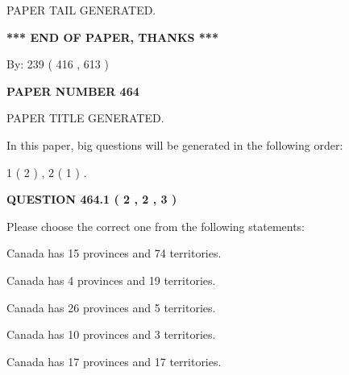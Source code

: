 \documentclass[12pt]{article}
\begin{document}
   
   
\vspace{2.0in} PAPER TAIL GENERATED.
   
   
   
   
\vspace{1.0in} 
{\textbf{\large{ *** END OF PAPER, THANKS *** }}} 
   
   
\hspace{1.0in} By: 
 239 ( 416 ,  613 )
   
   
   
   
\newpage 
\setcounter{page}{ 
   464001 } 
   
   
   
   
 {\textbf{ \Large{ PAPER NUMBER  464  }}}
   
   
\vspace{0.2in}
   
   
   
   
   
   
   
   
 \vspace{0.2in}
 
 
 
 
   
   
 PAPER TITLE GENERATED.
   
   
   
\vspace{0.2in}
   
In this paper, big questions will be generated in the following order: 
   
   
   1 ( 2 )
 ,
   2 ( 1 )
 .
  
\vspace{0.2in}
  
{\textbf{\Large{QUESTION
464.1 
 ( 2 , 2 , 3 )
}}}
  
  
Please choose the correct one from the following statements:
 
 
Canada has  15 provinces and  74 territories.
 
 
Canada has   4 provinces and  19 territories.
 
 
Canada has  26 provinces and  5 territories.
 
 
Canada has 10  provinces and 3 territories.
 
 
Canada has  17 provinces and  17 territories.
 
\end{document}
